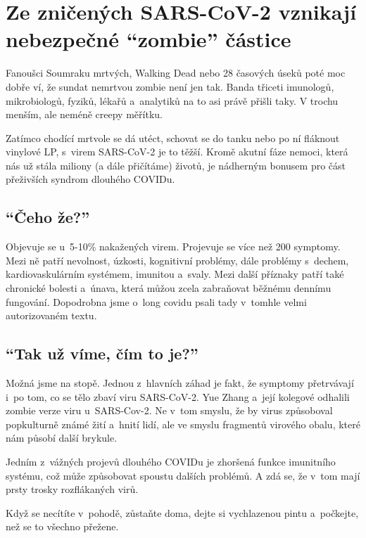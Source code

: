 \documentclass[main.tex]{subfiles}
\begin{document}
\section{Ze zničených SARS-CoV-2 vznikají nebezpečné “zombie” částice}
Fanoušci Soumraku mrtvých, Walking Dead nebo 28 časových úseků poté moc dobře ví, že sundat nemrtvou zombie není jen tak. Banda třiceti imunologů, mikrobiologů, fyziků, lékařů a~analytiků na to asi právě přišli taky. V trochu menším, ale neméně creepy měřítku.\par
Zatímco chodící mrtvole se dá utéct, schovat se do tanku nebo po ní fláknout vinylové LP, s~virem SARS-CoV-2 je to těžší. Kromě akutní fáze nemoci, která nás už stála miliony (a dále přičítáme) životů, je nádherným bonusem pro část přeživších syndrom dlouhého COVIDu. 
\subsection*{\enquote{Čeho že?}}
Objevuje se u~5-10\% nakažených virem. Projevuje se více než 200 symptomy. Mezi ně patří nevolnost, úzkosti, kognitivní problémy, dále problémy s~dechem, kardiovaskulárním systémem, imunitou a~svaly. Mezi další příznaky patří také chronické bolesti a~únava, která můžou zcela zabraňovat běžnému dennímu fungování. Dopodrobna jsme o~long covidu psali tady v~tomhle velmi autorizovaném textu.
\subsection*{\enquote{Tak už víme, čím to je?}}
Možná jsme na stopě. Jednou z~hlavních záhad je fakt, že symptomy přetrvávají i~po tom, co se tělo zbaví viru SARS-CoV-2. Yue Zhang a~její kolegové odhalili zombie verze viru u~SARS-Cov-2. Ne v~tom smyslu, že by virus způsoboval popkulturně známé žití a~hnití lidí, ale ve smyslu fragmentů virového obalu, které nám působí další brykule.\par
Jedním z~vážných projevů dlouhého COVIDu je zhoršená funkce imunitního systému, což může způsobovat spoustu dalších problémů. A zdá se, že v~tom mají prsty trosky rozflákaných virů.\par
Když se necítíte v~pohodě, zůstaňte doma, dejte si vychlazenou pintu a~počkejte, než se to všechno přežene. 
\end{document}
